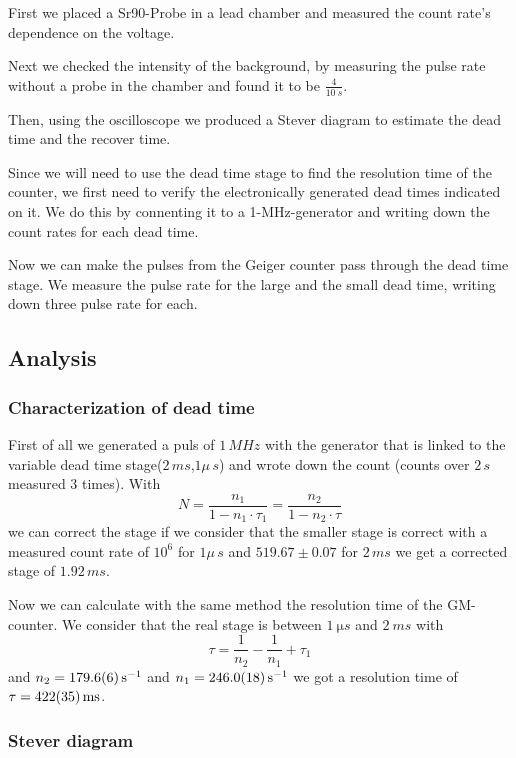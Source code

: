 First we placed a Sr90-Probe in a lead chamber and measured the count rate's dependence on the voltage.

Next we checked the intensity of the background, by measuring the pulse rate without a probe in the chamber and found it to be $\frac{4}{\SI{10}{s}}$.

Then, using the oscilloscope we produced a Stever diagram to estimate the dead time and the recover time.

Since we will need to use the dead time stage to find the resolution time of the counter, we first need to verify the electronically generated dead times indicated on it. We do this by connenting it to a 1-MHz-generator and writing down the count rates for each dead time.

Now we can make the pulses from the Geiger counter pass through the dead time stage. We measure the pulse rate for the large and the small dead time, writing down three pulse rate for each.

\subsection{Analysis}

\subsubsection{Characterization of dead time}

First of all we generated a puls of $1\,MHz$ with the generator
that is linked to the variable dead time stage($2\,ms$,$1\mu\,s$) and wrote down the count (counts over $2\,s$ measured $3$ times).
With
\begin{equation}
N =\frac{n_1}{1-n_1\cdot\tau_1}=\frac{n_2}{1-n_2\cdot\tau}
\end{equation}
we can correct the stage if we consider that the smaller stage is correct 
with a measured count rate of $10^6$ for $1\mu\,s$ and 
$519.67\pm0.07$ for $2\,ms$ we get a corrected stage of $1.92\,ms$.

Now we can calculate with the same method the resolution time of the GM-counter.
We consider that the real stage is between $\SI{1}{\micro s}$ and $\SI{2}{ms}$ with
\begin{equation}
\tau =\frac{1}{n_2}-\frac{1}{n_1}+\tau_1
\end{equation}
and $n_2=\SI{179.6\pm0.6}{s^{-1}}$ and $n_1=\SI{246.0\pm1.8}{s^{-1}}$ we got a resolution time of $\tau=\SI{422\pm35}{ms}$.

\subsubsection{Stever diagram}

